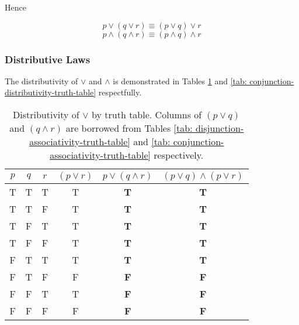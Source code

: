 \documentclass[twocolumn]{report}
\begin{document}
Hence
\begin{subequation}
	\begin{equation}
		p \lor (q \lor r) \equiv (p \lor q) \lor r
		\label{eqn: disjunction-associative-law}
	\end{equation}
	\begin{equation}
		p \wedge (q \wedge r) \equiv (p\wedge q) \wedge r
		\label{eqn: conjunction-associative-law}
	\end{equation}
\end{subequation}

\subsubsection{Distributive Laws}
The distributivity of $\lor$ and $\wedge$ is demonstrated in Tables \ref{tab: disjunction-distributivity-truth-table} and \ref{tab: conjunction-distributivity-truth-table} respectfully.
\begin{table}[h]
	\centering
	\begin{tabular}{ccc|c|c|c}
		$p$ & $q$ & $r$ & $(p \lor r)$ & $p \lor (q \wedge r) $ & $(p \lor q) \wedge (p \lor r)$ \\ \hline
		T & T & T & T & \textbf{T} & \textbf{T}  \\
		T & T & F & T & \textbf{T} & \textbf{T}  \\
		T & F & T & T & \textbf{T} & \textbf{T}  \\
		T & F & F & T & \textbf{T} & \textbf{T}  \\
		F & T & T & T & \textbf{T} & \textbf{T}  \\
		F & T & F & F & \textbf{F} & \textbf{F}  \\
		F & F & T & T & \textbf{F} & \textbf{F}  \\
		F & F & F & F & \textbf{F} & \textbf{F}  \\
	\end{tabular}
	\caption{Distributivity of $\lor$ by truth table. Columns of $(p\lor q)$ and $(q \wedge r)$ are borrowed from Tables \ref{tab: disjunction-associativity-truth-table} and \ref{tab: conjunction-associativity-truth-table} respectively.}
	\label{tab: disjunction-distributivity-truth-table}
\end{table}
\end{document}
